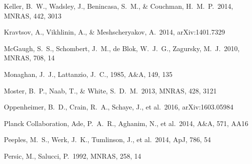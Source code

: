 \documentclass[useAMS,usenatbib]{mn2e}
\def \apj {ApJ}
\def \mnras {MNRAS}
\def \aap {A\&A}
\begin{document}
\begin{thebibliography}{}
 Keller, B.~W., Wadsley, 
  J., Benincasa, S.~M., \& Couchman, H.~M.~P.\ 2014, \mnras, 442, 3013

 Kravtsov, A., 
Vikhlinin, A., \& Meshscheryakov, A.\ 2014, arXiv:1401.7329 

  



 McGaugh, S.~S., 
Schombert, J.~M., de Blok, W.~J.~G., Zagursky, M.~J.\ 2010, \mnras,
708, 14

 Monaghan, J.~J., Lattanzio, J.~C., 1985, \aap, 149, 135

 Moster, B.~P., Naab, T., 
\& White, S.~D.~M.\ 2013, \mnras, 428, 3121 










%
Oppenheimer, B.~D., Crain, R.~A., Schaye, J., et al.\ 2016, arXiv:1603.05984


  Planck Collaboration, Ade, P.~A.~R., Aghanim, N., et al.\ 2014,
  \aap, 571, AA16 
 
 Peeples, M.~S., Werk, J.~K., Tumlinson, J., et al.\ 2014, \apj, 786, 54


 Persic, M., Salucci, P.\ 1992, \mnras, 258, 14


\end{thebibliography}
\end{document}
